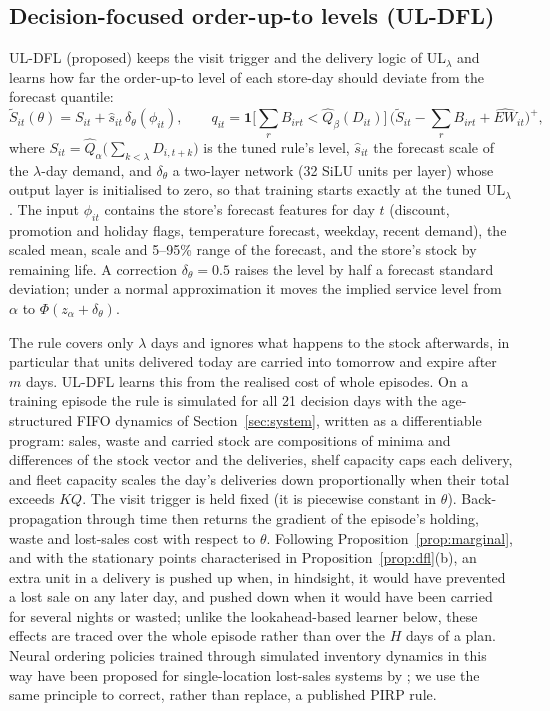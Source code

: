 \subsection{Decision-focused order-up-to levels (UL-DFL)}\label{sec:uldfl}

UL-DFL (proposed) keeps the visit trigger and the delivery logic of UL$_\lambda$ and learns how far the order-up-to level of each store-day should deviate from the forecast quantile:
\begin{equation}\label{eq:uldfl}
\tilde S_{it}(\theta)=S_{it}+\hat s_{it}\,\delta_\theta(\phi_{it}),\qquad q_{it}=\mathbf 1\Big[\textstyle\sum_r B_{irt}<\hat Q_\beta(D_{it})\Big]\,\Big(\tilde S_{it}-\textstyle\sum_r B_{irt}+\widehat{EW}_{it}\Big)^{+},
\end{equation}
where $S_{it}=\hat Q_\alpha\big(\sum_{k<\lambda}D_{i,t+k}\big)$ is the tuned rule's level, $\hat s_{it}$ the forecast scale of the $\lambda$-day demand, and $\delta_\theta$ a two-layer network (32 SiLU units per layer) whose output layer is initialised to zero, so that training starts exactly at the tuned UL$_\lambda$. The input $\phi_{it}$ contains the store's forecast features for day $t$ (discount, promotion and holiday flags, temperature forecast, weekday, recent demand), the scaled mean, scale and 5--95\% range of the forecast, and the store's stock by remaining life. A correction $\delta_\theta=0.5$ raises the level by half a forecast standard deviation; under a normal approximation it moves the implied service level from $\alpha$ to $\Phi(z_\alpha+\delta_\theta)$.

The rule covers only $\lambda$ days and ignores what happens to the stock afterwards, in particular that units delivered today are carried into tomorrow and expire after $m$ days. UL-DFL learns this from the realised cost of whole episodes. On a training episode the rule is simulated for all 21 decision days with the age-structured FIFO dynamics of Section~\ref{sec:system}, written as a differentiable program: sales, waste and carried stock are compositions of minima and differences of the stock vector and the deliveries, shelf capacity caps each delivery, and fleet capacity scales the day's deliveries down proportionally when their total exceeds $KQ$. The visit trigger is held fixed (it is piecewise constant in $\theta$). Back-propagation through time then returns the gradient of the episode's holding, waste and lost-sales cost with respect to $\theta$. Following Proposition~\ref{prop:marginal}, and with the stationary points characterised in Proposition~\ref{prop:dfl}(b), an extra unit in a delivery is pushed up when, in hindsight, it would have prevented a lost sale on any later day, and pushed down when it would have been carried for several nights or wasted; unlike the lookahead-based learner below, these effects are traced over the whole episode rather than over the $H$ days of a plan. Neural ordering policies trained through simulated inventory dynamics in this way have been proposed for single-location lost-sales systems by \citet{alvo2023neural}; we use the same principle to correct, rather than replace, a published PIRP rule.

